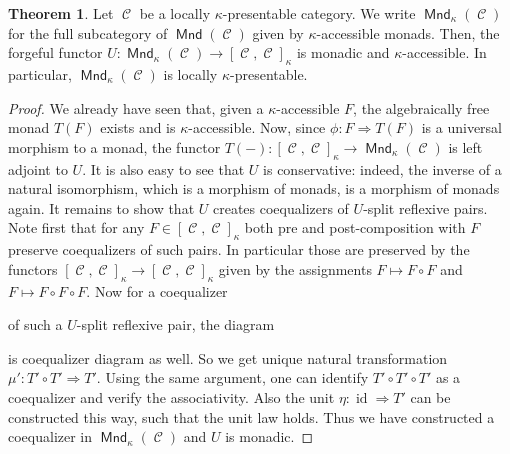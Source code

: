 \documentclass[a4paper,11pt,oneside,openany]{scrbook}
\newcommand{\from}{\colon}
\DeclareMathOperator{\C}{\mathcal{C}}
\DeclareMathOperator{\Mnd}{\mathsf{Mnd}}
\DeclareMathOperator{\id}{id}
\theoremstyle{definition}
\newtheorem{thm}{Theorem}[section] %
\theoremstyle{definition}
\begin{document}
\begin{thm}
    Let $\C$ be a locally $\kappa$-presentable category. We write $\Mnd_\kappa(\C)$ for the full subcategory of $\Mnd(\C)$ given by $\kappa$-accessible monads. Then, the forgeful functor $U\colon \Mnd_\kappa(\C)\rightarrow[\C,\C]_\kappa$ is monadic and $\kappa$-accessible. In particular, $\Mnd_\kappa(\C)$ is locally $\kappa$-presentable.
\end{thm}

\begin{proof}
   We already have seen that, given a $\kappa$-accessible $F$, the algebraically free monad $T(F)$ exists and is $\kappa$-accessible. Now, since 
   $\phi \from F \Rightarrow T(F)$ is a universal morphism to a monad, the functor $T(-) \from [\C,\C]_{\kappa} \to \Mnd_{\kappa}(\C)$ is left adjoint to $U$. 
   It is also easy to see that $U$ is conservative: indeed, the inverse of a natural isomorphism, which is a morphism of monads, is a morphism of monads again.
   It remains to show that $U$ creates coequalizers of $U$-split reflexive pairs. Note first that for any $F \in [\C,\C]_{\kappa}$ both pre and post-composition
   with $F$ preserve coequalizers of such pairs. In particular those are preserved by the functors $[\C,\C]_{\kappa} \to [\C,\C]_{\kappa}$ given by the assignments
   $F \mapsto F \circ F$ and $F \mapsto F \circ F \circ F$. Now for a coequalizer 
      \begin{center}
      \end{center}
   of such a $U$-split reflexive pair, the diagram 
      \begin{center}
      \end{center}
   is coequalizer diagram as well. So we get unique natural transformation $\mu' \from T' \circ T' \Rightarrow T'$.  Using the same argument, one can identify 
   $T' \circ T' \circ T'$ as a coequalizer and verify the associativity. Also the unit $\eta \from \id \Rightarrow T'$ can be constructed this way, such that the unit law
   holds. Thus we have constructed a coequalizer in $\Mnd_{\kappa}(\C)$ and $U$ is monadic.
   

\end{proof}
\end{document}

